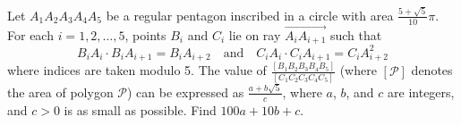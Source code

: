 Let $A_1A_2A_3A_4A_5$ be a regular pentagon inscribed in a circle with area $\frac{5+\sqrt{5}}{10}\pi$. For each $i=1,2,\dots,5$, points $B_i$ and $C_i$ lie on ray $\overrightarrow{A_iA_{i+1}}$ such that
\[B_iA_i \cdot B_iA_{i+1} = B_iA_{i+2} \quad \text{and} \quad C_iA_i \cdot C_iA_{i+1} = C_iA_{i+2}^2\]where indices are taken modulo 5. The value of $\frac{[B_1B_2B_3B_4B_5]}{[C_1C_2C_3C_4C_5]}$ (where $[\mathcal P]$ denotes the area of polygon $\mathcal P$) can be expressed as $\frac{a+b\sqrt{5}}{c}$, where $a$, $b$, and $c$ are integers, and $c > 0$ is as small as possible. Find $100a+10b+c$.
